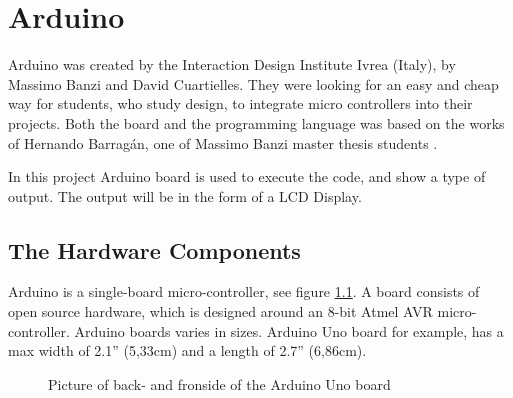 \chapter{Arduino}\label{analysis:arduino}
Arduino was created by the Interaction Design Institute Ivrea (Italy), by Massimo Banzi and David Cuartielles. They were looking for an easy and cheap way for students, who study design, to integrate micro controllers into their projects\cite{arduino:hist}. Both the board and the programming language was based on the works of Hernando Barragán, one of Massimo Banzi master thesis students \cite{Wiring:thesis}.

In this project Arduino board is used to execute the code, and show a type of output. The output will be in the form of a LCD Display. 

\section{The Hardware Components}
Arduino is a single-board micro-controller, see figure \ref{fig:Arduino_uno}.
A board consists of open source hardware, which is designed around an 8-bit Atmel AVR micro-controller. Arduino boards varies in sizes. Arduino Uno board for example, has a max width of 2.1'' (5,33cm) and a length of 2.7'' (6,86cm).  \\

\par
{}
\hfill
{}
\begin{figure}[H]
\caption{Picture of back- and fronside of the Arduino Uno board \cite{Arduino:board_pics}}
\label{fig:Arduino_uno}
\end{figure}
\par


